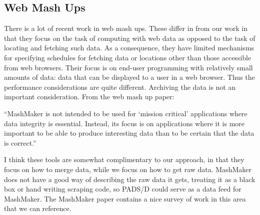 \subsection{Web Mash Ups}
There is a lot of recent work in web mash
ups\cite{ennals+:mashmaker,yahoopipes,swivel.com}.  These differ in
from our work in that they focus on the task of computing with web
data as opposed to the task of locating and fetching such data. As a
consequence, they have limited mechanisms for specifying schedules for
fetching data or locations other than those accessible from web
browsers.  Their focus is on end-user programming with relatively
small amounts of data: data that can be displayed to a user in a web
browser.  Thus the performance considerations are quite different.
Archiving the data is not an important consideration.  From the web
mash up paper:

``MashMaker is not intended to be used for `mission critical'
applications where data integrity is essential.  Instead, its focus is
on applications where it is more important to be able to produce
interesting data than to be certain that the data is correct.''

I think these tools are somewhat complimentary to our approach, in
that they focus on how to merge data, while we focus on how to get raw
data.  MashMaker does not have a good way of describing the raw data
it gets, treating it as a black box or hand writing scraping code, so
PADS/D could serve as a data feed for MashMaker.
The MashMaker paper contains a nice survey of work in this area that
we can reference.
